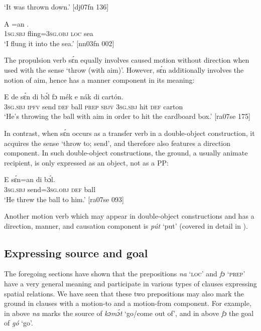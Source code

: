 \glt ‘It was thrown down.’ [dj07fn 136]
\z


\ea%
    \label{ex:key:967}
    \gll A    =an      .\\
\textsc{1sg.sbj}  fling=\textsc{3sg.obj}  \textsc{loc}  sea\\

\glt ‘I flung it into the sea.’ [nn03fn 002]
\z

The propulsion verb sɛ́n equally involves caused motion without direction when used with the sense ‘throw (with aim)’. However, sɛ́n additionally involves the notion of aim, hence has a manner component in its meaning:


\ea%
    \label{ex:key:968}
    \gll E    de  sɛ́n    di  bɔ́l  fɔ  mék  e    nák  di  cartón.\\
\textsc{3sg.sbj}  \textsc{ipfv}  send  \textsc{def}  ball  \textsc{prep}  \textsc{sbjv}  \textsc{3sg.sbj}  hit  \textsc{def}  carton\\

\glt ‘He’s throwing the ball with aim in order to hit the cardboard box.’ [ra07se 175]
\z

In contrast, when sɛ́n occurs as a transfer verb in a double-object construction, it acquires the sense ‘throw to; send’, and therefore also features a direction component. In such double-object constructions, the ground, a usually animate recipient{\fff}, is only expressed as an object, not as a PP: 


\ea%
    \label{ex:key:969}
    \gll E    sɛ́n=an    di  bɔ́l.\\
\textsc{3sg.sbj}  send=\textsc{3sg.obj}  \textsc{def}  ball\\

\glt ‘He threw the ball to him.’ [ra07se 093]
\z

Another motion verb which may appear in double-object constructions and has a direction, manner, and causation component is \textit{pút} ‘put’ (covered in detail in ).

\subsection{Expressing source and goal}\label{sec:8.1.5}

The foregoing sections have shown that the prepositions \textit{na} ‘\textsc{loc}’ and \textit{fɔ} ‘\textsc{prep}’ have a very general meaning and participate in various types of clauses expressing spatial relations. We have seen that these two prepositions may also mark the ground in clauses with a motion-to and a motion-from component. For example, in  above \textit{na} marks the source of \textit{kɔmɔ́t} ‘go/come out of’, and in  above \textit{fɔ} the goal of \textit{gó} ‘go’. 


